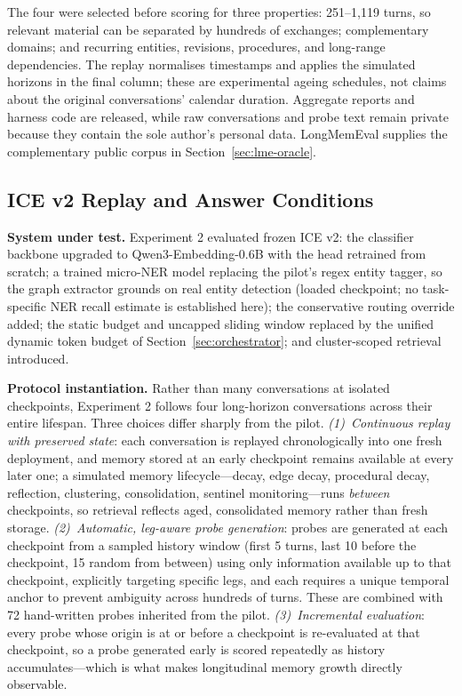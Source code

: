\documentclass[11pt,a4paper]{article}
\begin{document}
The four were selected before scoring for three properties: 251--1{,}119 turns, so relevant material can be separated by hundreds of exchanges; complementary domains; and recurring entities, revisions, procedures, and long-range dependencies. The replay normalises timestamps and applies the simulated horizons in the final column; these are experimental ageing schedules, not claims about the original conversations' calendar duration. Aggregate reports and harness code are released, while raw conversations and probe text remain private because they contain the sole author's personal data. LongMemEval supplies the complementary public corpus in Section~\ref{sec:lme-oracle}.

\subsection{ICE v2 Replay and Answer Conditions}
\label{sec:exp2-env}

\textbf{System under test.} Experiment 2 evaluated frozen ICE v2: the classifier backbone upgraded to Qwen3-Embedding-0.6B with the head retrained from scratch; a trained micro-NER model replacing the pilot's regex entity tagger, so the graph extractor grounds on real entity detection (loaded checkpoint; no task-specific NER recall estimate is established here); the conservative routing override added; the static budget and uncapped sliding window replaced by the unified dynamic token budget of Section~\ref{sec:orchestrator}; and cluster-scoped retrieval introduced.

\textbf{Protocol instantiation.} Rather than many conversations at isolated checkpoints, Experiment 2 follows four long-horizon conversations across their entire lifespan. Three choices differ sharply from the pilot. \emph{(1)~Continuous replay with preserved state}: each conversation is replayed chronologically into one fresh deployment, and memory stored at an early checkpoint remains available at every later one; a simulated memory lifecycle---decay, edge decay, procedural decay, reflection, clustering, consolidation, sentinel monitoring---runs \emph{between} checkpoints, so retrieval reflects aged, consolidated memory rather than fresh storage. \emph{(2)~Automatic, leg-aware probe generation}: probes are generated at each checkpoint from a sampled history window (first 5 turns, last 10 before the checkpoint, 15 random from between) using only information available up to that checkpoint, explicitly targeting specific legs, and each requires a unique temporal anchor to prevent ambiguity across hundreds of turns. These are combined with 72 hand-written probes inherited from the pilot. \emph{(3)~Incremental evaluation}: every probe whose origin is at or before a checkpoint is re-evaluated at that checkpoint, so a probe generated early is scored repeatedly as history accumulates---which is what makes longitudinal memory growth directly observable.
\end{document}
